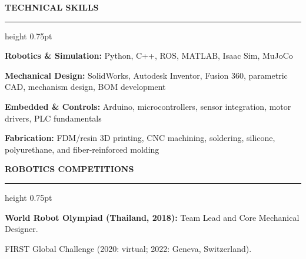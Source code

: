 \documentclass[10pt,letterpaper]{article}
\newcommand{\resumesection}[1]{%
  \par\vspace{7.5pt}%
  {\fontsize{10.5}{11}\selectfont\bfseries\MakeUppercase{#1}}\par
  \vspace{1pt}\hrule height 0.75pt\vspace{4.5pt}%
}
\begin{document}
\resumesection{Technical Skills}
\textbf{Robotics \& Simulation:} Python, C++, ROS, MATLAB, Isaac Sim, MuJoCo\par
\vspace{0.3pt}
\textbf{Mechanical Design:} SolidWorks, Autodesk Inventor, Fusion 360, parametric CAD, mechanism design, BOM development\par
\vspace{0.3pt}
\textbf{Embedded \& Controls:} Arduino, microcontrollers, sensor integration, motor drivers, PLC fundamentals\par
\vspace{0.3pt}
\textbf{Fabrication:} FDM/resin 3D printing, CNC machining, soldering, silicone, polyurethane, and fiber-reinforced molding

\resumesection{Robotics Competitions}
\textbf{World Robot Olympiad (Thailand, 2018):} Team Lead and Core Mechanical Designer.\par
FIRST Global Challenge (2020: virtual; 2022: Geneva, Switzerland).
\end{document}
